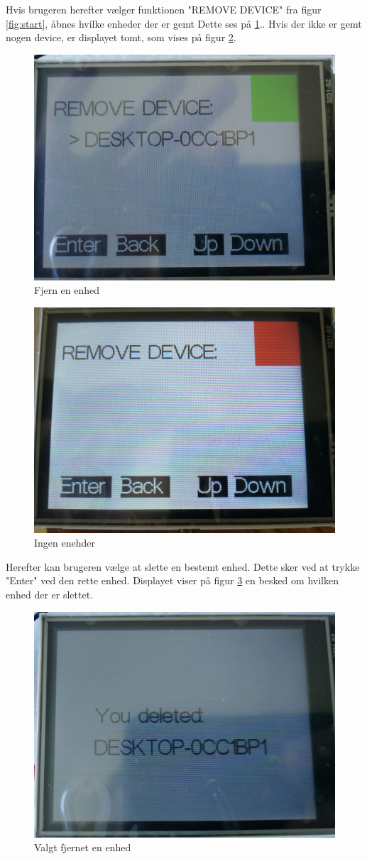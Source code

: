 Hvis brugeren herefter vælger funktionen "REMOVE DEVICE" fra figur \ref{fig:start}, åbnes hvilke enheder der er gemt Dette ses på \ref{fig:remove}.. Hvis der ikke er gemt nogen device, er displayet tomt, som vises på figur \ref{fig:noDevices}. 
\begin{figure}[H]
	\centering
	\includegraphics[width = 300 pt]{Img/remove.jpg}
	\caption{Fjern en enhed}
	\label{fig:remove}
\end{figure}
\begin{figure}[H]
	\centering
	\includegraphics[width = 300 pt]{Img/noDevice.jpg}
	\caption{Ingen enehder}
	\label{fig:noDevices}
\end{figure}
Herefter kan brugeren vælge at slette en bestemt enhed. Dette sker ved at trykke "Enter" ved den rette enhed. Displayet viser på figur \ref{fig:delete} en besked om hvilken enhed der er slettet. 
\begin{figure}[H]
	\centering
	\includegraphics[width = 300 pt]{Img/delete.jpg}
	\caption{Valgt fjernet en enhed}
	\label{fig:delete}
\end{figure}

